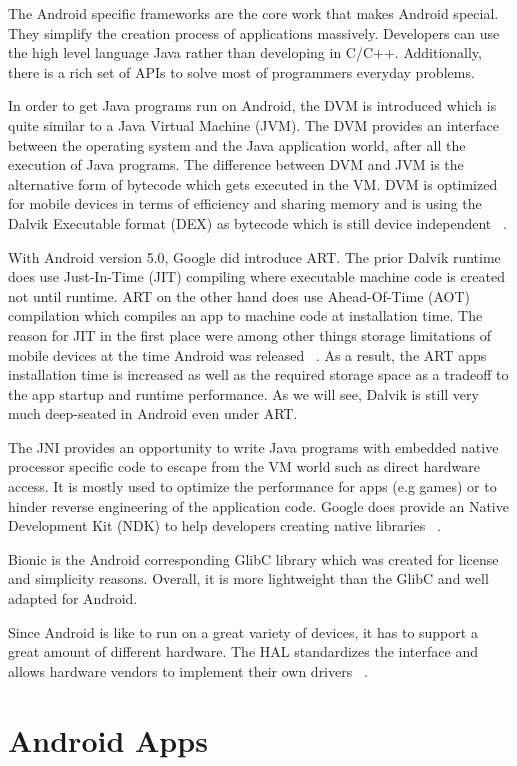 The Android specific frameworks are the core work that makes Android
special. They simplify the creation process of applications massively.
Developers can use the high level language Java rather than developing
in C/C++. Additionally, there is a rich set of APIs to solve most of
programmers everyday problems.

In order to get Java programs run on Android, the DVM is introduced
which is quite similar to a Java Virtual Machine (JVM).
The DVM provides an interface between the operating system and
the Java application world, after all the execution of Java programs.
The difference between DVM and JVM is the alternative form of bytecode
which gets executed in the VM. DVM is optimized for mobile devices
in terms of efficiency and sharing memory and is using the
Dalvik Executable format (DEX) as bytecode which is still device
independent ~\parencite{levin}.

With Android version 5.0, Google did introduce ART.
The prior Dalvik runtime does use Just-In-Time (JIT) compiling
where executable machine code is created not until runtime.
ART on the other hand does use Ahead-Of-Time (AOT) compilation
which compiles an app to machine code at installation time.
The reason for JIT in the first place were among other things
storage limitations of mobile devices at the time Android was released
~\parencite{levin}. As a result, the ART apps installation time
is increased as well as the required storage space as a tradeoff
to the app startup and runtime performance. As we will see,
Dalvik is still very much deep-seated in Android even under ART.

The JNI provides an opportunity to write Java programs with embedded
native processor specific code to escape from the VM world
such as direct hardware access.
It is mostly used to optimize the performance for apps (e.g games)
or to hinder reverse engineering of the application code.
Google does provide an Native Development Kit (NDK) to help
developers creating native libraries ~\parencite{ndk}.

Bionic is the Android corresponding GlibC library which was created
for license and simplicity reasons. Overall, it is more lightweight
than the GlibC and well adapted for Android.

Since Android is like to run on a great variety of devices,
it has to support a great amount of different hardware.
The HAL standardizes the interface and allows hardware vendors
to implement their own drivers ~\parencite{levin}.

\section{Android Apps}
